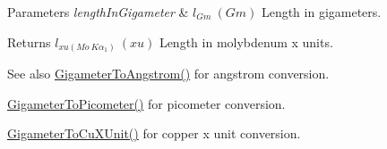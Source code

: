 \begin{DoxyParams}{Parameters}
{\em length\+In\+Gigameter} & $ l_{Gm}\ (Gm)$ Length in gigameters. \\
\hline
\end{DoxyParams}
\begin{DoxyReturn}{Returns}
$ l_{xu(Mo\ K\alpha_1)}\ (xu)$ Length in molybdenum x units. 
\end{DoxyReturn}
\begin{DoxySeeAlso}{See also}
\mbox{\hyperlink{group___e_g_x_math-_conversions-_length_conversions-_gigameter-_non-_s_i_ga622e85e3f663039f3802b29d25655989}{Gigameter\+To\+Angstrom()}} for angstrom conversion. 

\mbox{\hyperlink{group___e_g_x_math-_conversions-_length_conversions-_gigameter-_s_i_gae9cea35a0ce747d02ec8b6cf7bfeaa7e}{Gigameter\+To\+Picometer()}} for picometer conversion. 

\mbox{\hyperlink{group___e_g_x_math-_conversions-_length_conversions-_gigameter-_non-_s_i_gab542297b31676ef5b3cf62f0c63a6f20}{Gigameter\+To\+Cu\+X\+Unit()}} for copper x unit conversion. 
\end{DoxySeeAlso}
